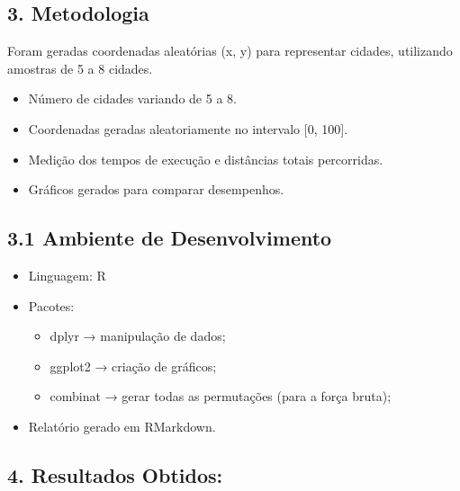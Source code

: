 \documentclass[
]{article}
\providecommand{\tightlist}{%
  \setlength{\itemsep}{0pt}\setlength{\parskip}{0pt}}
\begin{document}
\hypertarget{metodologia}{%
\subsection{3. Metodologia}\label{metodologia}}

Foram geradas coordenadas aleatórias (x, y) para representar cidades,
utilizando amostras de 5 a 8 cidades.

\begin{itemize}
\tightlist
\item
  Número de cidades variando de 5 a 8.
\item
  Coordenadas geradas aleatoriamente no intervalo {[}0, 100{]}.
\item
  Medição dos tempos de execução e distâncias totais percorridas.
\item
  Gráficos gerados para comparar desempenhos.
\end{itemize}

\hypertarget{ambiente-de-desenvolvimento}{%
\subsection{3.1 Ambiente de
Desenvolvimento}\label{ambiente-de-desenvolvimento}}

\begin{itemize}
\tightlist
\item
  Linguagem: R
\item
  Pacotes:

  \begin{itemize}
  \tightlist
  \item
    dplyr → manipulação de dados;
  \item
    ggplot2 → criação de gráficos;
  \item
    combinat → gerar todas as permutações (para a força bruta);
  \end{itemize}
\item
  Relatório gerado em RMarkdown.
\end{itemize}

\hypertarget{resultados-obtidos}{%
\subsection{4. Resultados Obtidos:}\label{resultados-obtidos}}
\end{document}
